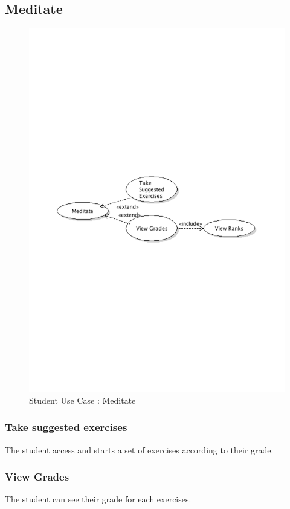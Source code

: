 	\subsection{Meditate}
		\begin{figure}[ht]
			\begin{center}
				\includegraphics[width=\textwidth,  trim=2cm 12cm 2cm 12cm]{UML_figure/UC/student/UC_Student_Meditate.pdf}
				\caption{Student Use Case : Meditate}
			\end{center}
		\end{figure}
		\subsubsection{Take suggested exercises}
			The student access and starts a set of exercises according to their grade.
		\subsubsection{View Grades}
			The student can see their grade for each exercises.
